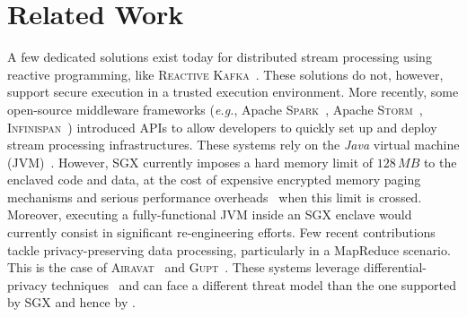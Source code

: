 \section{Related Work}\label{sec:rw}
% 
% 
A few dedicated solutions exist today for distributed stream processing using reactive programming, like \textsc{Reactive Kafka}~\cite{reactivekafka}.
These solutions do not, however, support secure execution in a trusted execution environment.
% 
More recently, some open-source middleware frameworks (\emph{e.g.}, Apache \textsc{Spark}~\cite{apachesparkstreaming}, Apache \textsc{Storm}~\cite{apachestorm}, \textsc{Infinispan}~\cite{infinispan}) introduced APIs to allow developers to quickly set up and deploy stream processing infrastructures.
These systems rely on the \emph{Java} virtual machine (JVM)~\cite{lindholm2014java}.
However, SGX currently imposes a hard memory limit of $128\,MB$ to the enclaved code and data, at the cost of expensive encrypted memory paging mechanisms and serious performance overheads~\cite{pires_scbr:2016,brenner_securekeeper:_2016} when this limit is crossed.
Moreover, executing a fully-functional JVM inside an SGX enclave would currently consist in significant re-engineering efforts.
% 
Few recent contributions tackle privacy-preserving data processing, particularly in a MapReduce scenario.
This is the case of \textsc{Airavat}~\cite{Roy:2010:ASP:1855711.1855731} and \textsc{Gupt}~\cite{Mohan:2012:GPP:2213836.2213876}.
These systems leverage differential-privacy techniques~\cite{dwork2006calibrating} and can face a different threat model than the one supported by SGX and hence by \SYS.
